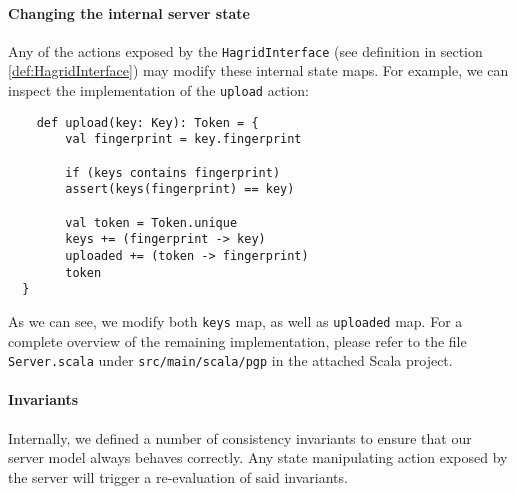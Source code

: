 \paragraph{Changing the internal server state}
Any of the actions exposed by the \texttt{HagridInterface} (see definition in section \ref{def:HagridInterface}) may modify these internal state maps.
For example, we can inspect the implementation of the \texttt{upload} action:
\begin{verbatim}
    def upload(key: Key): Token = {
        val fingerprint = key.fingerprint

        if (keys contains fingerprint)
        assert(keys(fingerprint) == key)

        val token = Token.unique
        keys += (fingerprint -> key)
        uploaded += (token -> fingerprint)
        token
  }
\end{verbatim}
As we can see, we modify both \texttt{keys} map, as well as \texttt{uploaded} map. For a complete overview of the remaining implementation, please refer to the file \texttt{Server.scala} under \texttt{src/main/scala/pgp} in the attached Scala project.

\paragraph{Invariants} 
Internally, we defined a number of consistency invariants to ensure that our server model always behaves correctly. 
Any state manipulating action exposed by the server will trigger a re-evaluation of said invariants.

